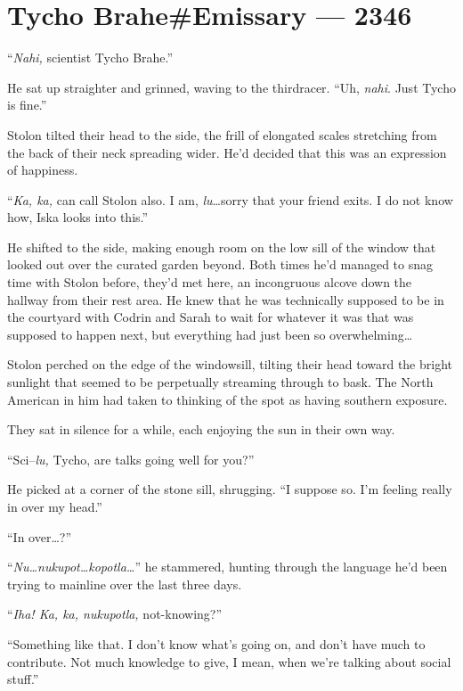 \hypertarget{tycho-braheemissary-2346}{%
\chapter{Tycho Brahe\#Emissary — 2346}}

\noindent ``\emph{Nahi,} scientist Tycho Brahe.''

He sat up straighter and grinned, waving to the thirdracer. ``Uh, \emph{nahi}. Just Tycho is fine.''

Stolon tilted their head to the side, the frill of elongated scales stretching from the back of their neck spreading wider. He'd decided that this was an expression of happiness.

``\emph{Ka, ka,} can call Stolon also. I am, \emph{lu}\ldots sorry that your friend exits. I do not know how, Iska looks into this.''

He shifted to the side, making enough room on the low sill of the window that looked out over the curated garden beyond. Both times he'd managed to snag time with Stolon before, they'd met here, an incongruous alcove down the hallway from their rest area. He knew that he was technically supposed to be in the courtyard with Codrin and Sarah to wait for whatever it was that was supposed to happen next, but everything had just been so overwhelming\ldots{}

Stolon perched on the edge of the windowsill, tilting their head toward the bright sunlight that seemed to be perpetually streaming through to bask. The North American in him had taken to thinking of the spot as having southern exposure.

They sat in silence for a while, each enjoying the sun in their own way.

``Sci--\emph{lu,} Tycho, are talks going well for you?''

He picked at a corner of the stone sill, shrugging. ``I suppose so. I'm feeling really in over my head.''

``In over\ldots?''

``\emph{Nu\ldots nukupot\ldots kopotla\ldots{}}'' he stammered, hunting through the language he'd been trying to mainline over the last three days.

``\emph{Iha! Ka, ka, nukupotla,} not-knowing?''

``Something like that. I don't know what's going on, and don't have much to contribute. Not much knowledge to give, I mean, when we're talking about social stuff.''

